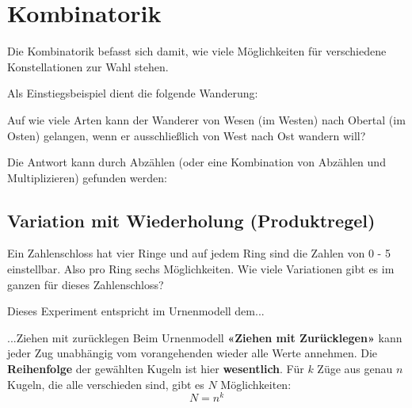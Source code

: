 \newpage
\section{Kombinatorik}
Die Kombinatorik befasst sich damit, wie viele Möglichkeiten für
verschiedene Konstellationen zur Wahl stehen.

Als Einstiegsbeispiel dient die folgende Wanderung:

\vspace{5mm}


Auf wie viele Arten kann der Wanderer von Wesen (im Westen) nach Obertal (im Osten) gelangen, wenn er ausschließlich von West nach Ost wandern will?

Die Antwort kann durch Abzählen (oder eine Kombination von Abzählen und Multiplizieren) gefunden werden:


\newpage
\subsection{Variation mit Wiederholung (Produktregel)}
Ein Zahlenschloss hat vier Ringe und auf jedem Ring sind die Zahlen
von 0 - 5 einstellbar. Also pro Ring sechs Möglichkeiten.
Wie viele Variationen gibt es im ganzen für dieses Zahlenschloss?



Dieses Experiment entspricht im Urnenmodell dem...
\begin{gesetz}{...Ziehen mit zurücklegen}{}
Beim Urnenmodell \textbf{«Ziehen mit Zurücklegen»} kann jeder Zug unabhängig vom
vorangehenden wieder alle Werte annehmen. Die \textbf{Reihenfolge} der gewählten Kugeln ist hier \textbf{wesentlich}. Für $k$ Züge aus genau $n$
Kugeln, die alle verschieden sind, gibt es $N$ Möglichkeiten:
$$N = n^k$$
\end{gesetz}


